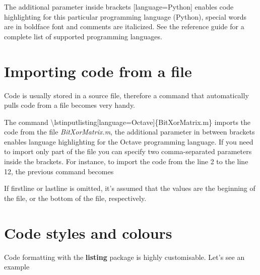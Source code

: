 The additional parameter inside brackets [language=Python] enables code highlighting for this particular programming language (Python), special words are in boldface font and comments are italicized. See the reference guide for a complete list of supported programming languages.

\section{Importing code from a file}
Code is usually stored in a source file, therefore a command that automatically pulls code from a file becomes very handy.

		
The command \textbackslash lstinputlisting[language=Octave]\{BitXorMatrix.m\} imports the code from the file \textit{BitXorMatrix.m}, the additional parameter in between brackets enables language highlighting for the Octave programming language. If you need to import only part of the file you can specify two comma-separated parameters inside the brackets. For instance, to import the code from the line 2 to the line 12, the previous command becomes


If firstline or lastline is omitted, it's assumed that the values are the beginning of the file, or the bottom of the file, respectively.

\section{Code styles and colours}
Code formatting with the \textbf{listing} package is highly customisable. Let's see an example

